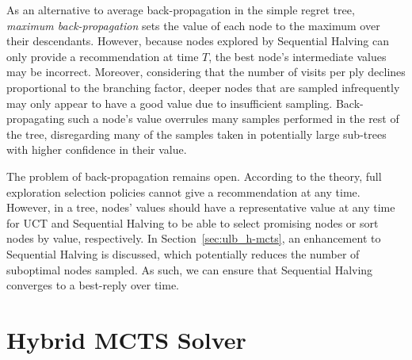 \documentclass{kecsmstr}
\begin{document}
As an alternative to average back-propagation in the simple regret tree, \emph{maximum back-propagation} sets the value of each node to the maximum over their descendants. However, because nodes explored by Sequential Halving can only provide a recommendation at time $T$, the best node's intermediate values may be incorrect. Moreover, considering that the number of visits per ply declines proportional to the branching factor, deeper nodes that are sampled infrequently may only appear to have a good value due to insufficient sampling. Back-propagating such a node's value overrules many samples performed in the rest of the tree, disregarding many of the samples taken in potentially large sub-trees with higher confidence in their value.

The problem of back-propagation remains open. According to the theory, full exploration selection policies cannot give a recommendation at any time. However, in a tree, nodes' values should have a representative value at any time for UCT and Sequential Halving to be able to select promising nodes or sort nodes by value, respectively. In Section~\ref{sec:ulb_h-mcts}, an enhancement to Sequential Halving is discussed, which potentially reduces the number of suboptimal nodes sampled. As such, we can ensure that Sequential Halving converges to a best-reply over time.

\newpage
\section{Hybrid MCTS Solver}
\label{sec:hybmctssolver}
\end{document}
